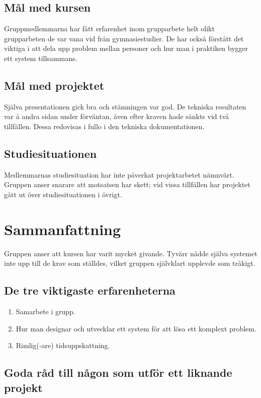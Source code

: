 \documentclass[10pt,oneside,swedish]{lips}
\begin{document}
\subsection{Mål med kursen}

Gruppmedlemmarna har fått erfarenhet inom grupparbete helt olikt grupparbeten de
var vana vid från gymnasiestudier. De har också förstått det viktiga i att dela
upp problem mellan personer och hur man i praktiken bygger ett system
tillsammans.

\subsection{Mål med projektet}

Själva presentationen gick bra och stämningen var god. De tekniska resultaten
var å andra sidan under förväntan, även efter kraven hade sänkts vid två
tillfällen. Dessa redovisas i fullo i den tekniska dokumentationen.

\subsection{Studiesituationen}

Medlemmarnas studiesituation har inte påverkat projektarbetet nämnvärt. Gruppen
anser snarare att motsatsen har skett; vid vissa tillfällen har projektet gått
ut över studiesituationen i övrigt.

\section{Sammanfattning}

Gruppen anser att kursen har varit mycket givande. Tyvärr nådde själva systemet
inte upp till de krav som ställdes, vilket gruppen självklart upplevde som
tråkigt.

\subsection{De tre viktigaste erfarenheterna}

\begin{enumerate}
	\item Samarbete i grupp.
	\item Hur man designar och utvecklar ett system för att lösa ett komplext
		problem.
	\item Rimlig(-are) tidsuppskattning.
\end{enumerate}

\subsection{Goda råd till någon som utför ett liknande projekt}
\end{document}
